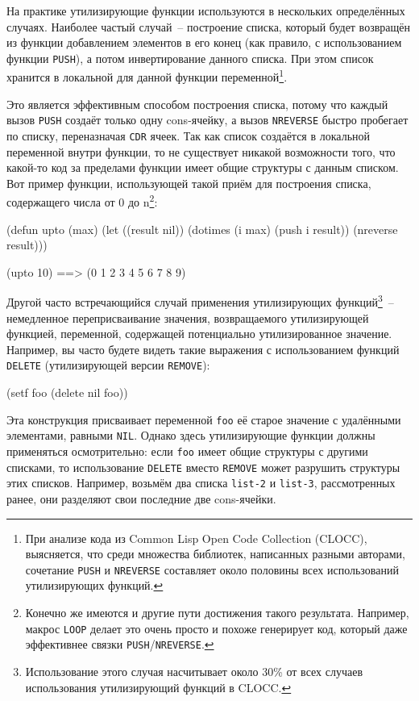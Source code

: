 На практике утилизирующие функции используются в нескольких определённых
случаях. Наиболее частый случай~-- построение списка, который будет возвращён из функции
добавлением элементов в его конец (как правило, с использованием функции \lstinline{PUSH}), а
потом инвертирование данного списка. При этом список хранится в локальной для данной
функции переменной\footnote{При анализе кода из Common Lisp Open Code Collection
  (CLOCC), выясняется, что среди множества библиотек, написанных разными авторами,
  сочетание \lstinline{PUSH} и \lstinline{NREVERSE} составляет около половины всех использований
  утилизирующих функций.}.

Это является эффективным способом построения списка, потому что каждый вызов \lstinline{PUSH}
создаёт только одну cons-ячейку, а вызов \lstinline{NREVERSE} быстро пробегает по списку,
переназначая \lstinline{CDR} ячеек. Так как список создаётся в локальной переменной внутри
функции, то не существует никакой возможности того, что какой-то код за пределами функции имеет общие
структуры с данным списком. Вот пример функции, использующей такой приём для
построения списка, содержащего числа от 0 до n\footnote{Конечно же имеются и другие
  пути достижения такого результата. Например, макрос \lstinline{LOOP} делает это очень просто
  и похоже генерирует код, который даже эффективнее связки \lstinline{PUSH}/\lstinline{NREVERSE}.}:

\begin{myverb}
(defun upto (max)
  (let ((result nil))
    (dotimes (i max)
      (push i result))
    (nreverse result)))

(upto 10) ==> (0 1 2 3 4 5 6 7 8 9)
\end{myverb}

Другой часто встречающийся случай применения утилизирующих функций\footnote{Использование
  этого случая насчитывает около 30\% от всех случаев использования утилизирующий функций
  в CLOCC.}~-- немедленное переприсваивание значения, возвращаемого утилизирующей функцией,
переменной, содержащей потенциально утилизированное значение. Например, вы часто будете
видеть такие выражения с использованием функций \lstinline{DELETE} (утилизирующей версии
\lstinline{REMOVE}):

\begin{myverb}
(setf foo (delete nil foo))
\end{myverb}

Эта конструкция присваивает переменной \lstinline{foo} её старое значение с удалёнными
элементами, равными \lstinline{NIL}. Однако здесь утилизирующие функции должны применяться
осмотрительно: если \lstinline{foo} имеет общие структуры с другими списками, то использование
\lstinline{DELETE} вместо \lstinline{REMOVE} может разрушить структуры этих списков. Например,
возьмём два списка \lstinline{list-2} и \lstinline{list-3}, рассмотренных ранее, они разделяют свои
последние две cons-ячейки.

